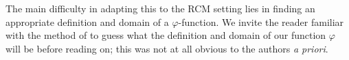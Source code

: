 \documentclass[a4paper,12pt]{scrartcl}
\newcommand{\E}{\mathbb{E}}
\renewcommand{\P}{\mathbb{P}}
\renewcommand{\d}{\mathrm{d}}
\newcommand{\reals}{\mathbb{R}}
\theoremstyle{definition}
\theoremstyle{remark}
\begin{document}
The main difficulty in adapting this to the RCM
setting
lies in finding an appropriate definition and domain of
a $\varphi$-function.
We invite the reader familiar with the method of
\cite{duminilcopin2015new} to guess what the definition and
domain of our function $\varphi$ will be before reading on;
this was not at all obvious to the authors
{\em a priori}.



\end{document}
